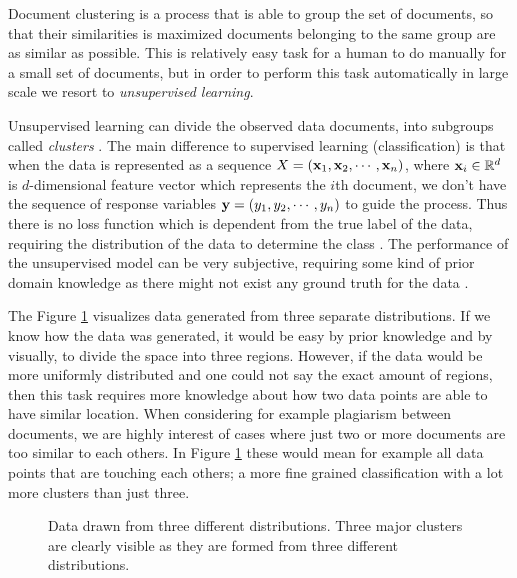Document clustering is a process that is able to group the set of documents, so that their similarities is maximized \ie documents belonging to the same group are as similar as possible. This is relatively easy task for a human to do manually for a small set of documents, but in order to perform this task automatically in large scale we resort to \emph{unsupervised learning}. 

Unsupervised learning can divide the observed data \ie documents, into subgroups called \emph{clusters} \cite{hastie_09_elements-of.statistical-learning}. The main difference to supervised learning (classification) is that when the data is represented as a sequence $X = (\mathbf{x}_1, \mathbf{x}_2, \cdots, \mathbf{x}_n)$, where $\mathbf{x}_i \in \mathbb{R}^d$ is $d$-dimensional feature vector which represents the $i$th document, we don't have the sequence of response variables $\mathbf{y} = (y_1, y_2, \cdots, y_n)$ to guide the process. Thus there is no loss function which is dependent from the true label of the data, requiring the distribution of the data to determine the class \cite{Manning:2008:IIR:1394399}. The performance of the unsupervised model can be very subjective, requiring some kind of prior domain knowledge as there might not exist any ground truth for the data \cite{hastie_09_elements-of.statistical-learning}. 

The Figure \ref{fig-clust-example} visualizes data generated from three separate distributions. If we know how the data was generated, it would be easy by prior knowledge and by visually, to divide the space into three regions. However, if the data would be more uniformly distributed and one could not say the exact amount of regions, then this task requires more knowledge about how two data points are able to have similar location. When considering for example plagiarism between documents, we are highly interest of cases where just two or more documents are too similar to each others. In Figure \ref{fig-clust-example} these would mean for example all data points that are touching each others; a more fine grained classification with a lot more clusters than just three. 

\begin{figure}[!h]
\centering
\setlength\figureheight{7cm}
\setlength\figurewidth{7cm}

\caption{Data drawn from three different distributions. Three major clusters are clearly visible as they are formed from three different distributions.} \label{fig-clust-example}
\end{figure}

